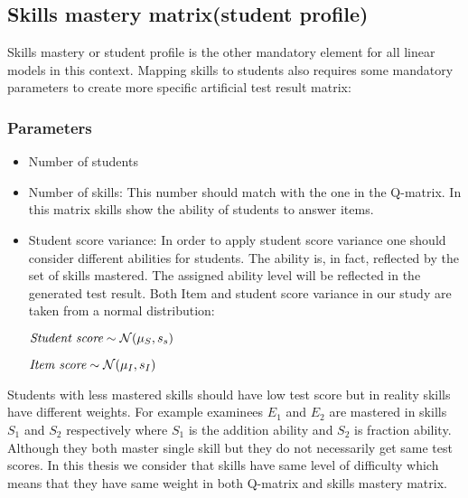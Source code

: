 \subsection{Skills mastery matrix(student profile)}
\label{Student_Profile}
Skills mastery or student profile is the other mandatory element for all linear models in this context. Mapping skills to students also requires some mandatory parameters to create more specific artificial test result matrix:
\subsubsection{Parameters}
\begin{itemize}
\item Number of students 
\item Number of skills: This number should match with the one in the Q-matrix. In this matrix skills show the ability of students to answer items.
\item Student score variance:  In order to apply student score variance one should consider different abilities for students. The ability is, in fact, reflected by the set of skills mastered. The assigned ability level will be reflected in the generated test result. Both Item and student score variance in our study are taken from a normal distribution:

\begin{center}
$\textit{Student score} \sim \mathcal{N}(\mu_S, s_s)$

$\textit{Item score} \sim \mathcal{N}(\mu_I, s_I)$
\end{center}

\end{itemize}


Students with less mastered skills should have low test score but in reality skills have different weights. For example examinees $E_1$ and $E_2$ are mastered in skills $S_1$ and $S_2$ respectively where $S_1$ is the addition ability and $S_2$ is fraction ability. Although they both master single skill but they do not necessarily get same test scores. In this thesis we consider that skills have same level of difficulty which means that they have same weight in both Q-matrix and skills mastery matrix. 



